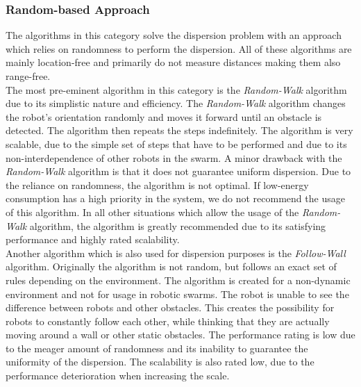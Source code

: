 \subsubsection{Random-based Approach}
The algorithms in this category solve the dispersion problem with an approach which relies on randomness to perform the dispersion.
All of these algorithms are mainly location-free and primarily do not measure distances making them also range-free.\\
The most pre-eminent algorithm in this category is the \emph{Random-Walk} algorithm due to its simplistic nature and efficiency. \cite{morlok2007dispersing}
The \emph{Random-Walk} algorithm changes the robot's orientation randomly and moves it forward until an obstacle is detected. 
The algorithm then repeats the steps indefinitely.
The algorithm is very scalable, due to the simple set of steps that have to be performed and due to its non-interdependence of other robots in the swarm.
A minor drawback with the \emph{Random-Walk} algorithm is that it does not guarantee uniform dispersion.
Due to the reliance on randomness, the algorithm is not optimal. 
If low-energy consumption has a high priority in the system, we do not recommend the usage of this algorithm.
In all other situations which allow the usage of the \emph{Random-Walk} algorithm, the algorithm is greatly recommended due to its satisfying performance and highly rated scalability.\\
Another algorithm which is also used for dispersion purposes is the \emph{Follow-Wall} algorithm. \cite{morlok2007dispersing}
Originally the algorithm is not random, but follows an exact set of rules depending on the environment. 
The algorithm is created for a non-dynamic environment and not for usage in robotic swarms.
The robot is unable to see the difference between robots and other obstacles. This creates the possibility for robots to constantly follow each other, while thinking that they are actually moving around a wall or other static obstacles.
The performance rating is low due to the meager amount of randomness and its inability to guarantee the uniformity of the dispersion. 
The scalability is also rated low, due to the performance deterioration when increasing the scale.

